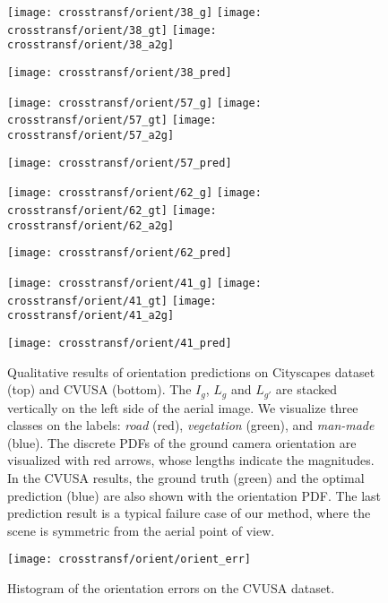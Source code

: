 \begin{figure*}
\vspace{5pt}
  \setlength{\aheight}{63pt}
  \setlength{\gwidth}{53.25pt}
  \begin{minipage}[b]{\gwidth}
  \texttt{[image: crosstransf/orient/38\_g]}
  \texttt{[image: crosstransf/orient/38\_gt]}
  \texttt{[image: crosstransf/orient/38\_a2g]}
  \end{minipage}
  \texttt{[image: crosstransf/orient/38\_pred]}
  \hfill
  \begin{minipage}[b]{\gwidth}
  \texttt{[image: crosstransf/orient/57\_g]}
  \texttt{[image: crosstransf/orient/57\_gt]}
  \texttt{[image: crosstransf/orient/57\_a2g]}
  \end{minipage}
  \texttt{[image: crosstransf/orient/57\_pred]}
  \hfill
  \begin{minipage}[b]{\gwidth}
  \texttt{[image: crosstransf/orient/62\_g]}
  \texttt{[image: crosstransf/orient/62\_gt]}
  \texttt{[image: crosstransf/orient/62\_a2g]}
  \end{minipage}
  \texttt{[image: crosstransf/orient/62\_pred]}
  \hfill
  \begin{minipage}[b]{\gwidth}
  \texttt{[image: crosstransf/orient/41\_g]}
  \texttt{[image: crosstransf/orient/41\_gt]}
  \texttt{[image: crosstransf/orient/41\_a2g]}
  \end{minipage}
  \texttt{[image: crosstransf/orient/41\_pred]}

  \caption{Qualitative results of orientation predictions on Cityscapes
dataset (top) and CVUSA (bottom). The $I_g$, $L_g$ and
$L_{g'}$ are stacked vertically on the left side of the aerial image.
We visualize three classes on the labels:
    {\em road} (red), {\em vegetation} (green), and {\em man-made} 
    (blue).
The discrete PDFs of the ground camera orientation are visualized with
red arrows, whose lengths indicate the magnitudes. In the CVUSA
results, the ground truth (green) and the optimal prediction (blue)
are also shown with the orientation PDF. The last prediction result is
a typical failure case of our method, where the scene is symmetric
from the aerial point of view.}
  \label{fig:orient:qualitative}
\end{figure*}

\begin{figure}
	\centering
	\texttt{[image: crosstransf/orient/orient\_err]}
  \caption{Histogram of the orientation errors on the CVUSA dataset.}
	\label{fig:orient:err}
\end{figure}

